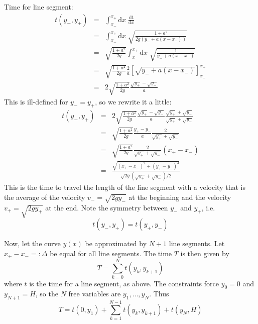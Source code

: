 \documentclass[a4paper]{article}
\begin{document}
Time for line segment:
\begin{eqnarray}
t(y_-, y_+) &=& \int_{x_-}^{x_+} \mathrm{d}x\; \frac{\mathrm{d}t}{\mathrm{d}x}\\
&=& \int_{x_-}^{x_+} \mathrm{d}x\;\sqrt{\frac{1+a^2}{2g(y_- + a(x - x_-))}}\\
&=& \sqrt{\frac{1+a^2}{2g}} \int_{x_-}^{x_+} \mathrm{d}x\; \sqrt{\frac{1}{y_- + a(x - x_-)}}\\
&=& \sqrt{\frac{1+a^2}{2g}} \frac{2}{a} \left[\sqrt{y_- + a(x - x_-)}\right]_{x_-}^{x_+}\\
&=& 2\sqrt{\frac{1+a^2}{2g}} \frac{\sqrt{y_+} - \sqrt{y_-}}{a}
\end{eqnarray}
This is ill-defined for $y_- = y_+$, so we rewrite it a little:
\begin{eqnarray}
t(y_-, y_+) &=& 2\sqrt{\frac{1+a^2}{2g}} \frac{\sqrt{y_+} - \sqrt{y_-}}{a} \frac{\sqrt{y_+} + \sqrt{y_-}}{\sqrt{y_+} + \sqrt{y_-}}\\
&=& \sqrt{\frac{1+a^2}{2g}} \frac{y_+ - y_-}{a} \frac{2}{\sqrt{y_+} + \sqrt{y_-}}\\
&=& \sqrt{\frac{1+a^2}{2g}} \frac{2}{\sqrt{y_+} + \sqrt{y_-}} (x_+ - x_-)\\
&=& \frac{\sqrt{(x_+ - x_-)^2 + (y_+ - y_-)^2}}{\sqrt{2 g}(\sqrt{y_+} + \sqrt{y_-})/2}
\end{eqnarray}
This is the time to travel the length of the line segment with a velocity that is the average of the velocity $v_- = \sqrt{2 g y_-}$ at the beginning and the velocity $v_+ = \sqrt{2 g y_+}$ at the end. Note the symmetry between $y_-$ and $y_+$, i.e.
\begin{equation}
t(y_-, y_+) = t(y_+, y_-)
\end{equation}

Now, let the curve $y(x)$ be approximated by $N+1$ line segments. Let $x_+ - x_- =: \Delta$ be equal for all line segments. The time $T$ is then given by
\begin{equation}
T = \sum_{k=0}^{N} t(y_k, y_{k+1})
\end{equation}
where $t$ is the time for a line segment, as above. The constraints force $y_0 = 0$ and $y_{N+1} = H$, so the $N$ free variables are $y_1, \ldots, y_N$. Thus
\begin{equation}
T = t(0, y_1) + \sum_{k=1}^{N-1} t(y_k, y_{k+1}) + t(y_N, H)
\end{equation}
\end{document}
